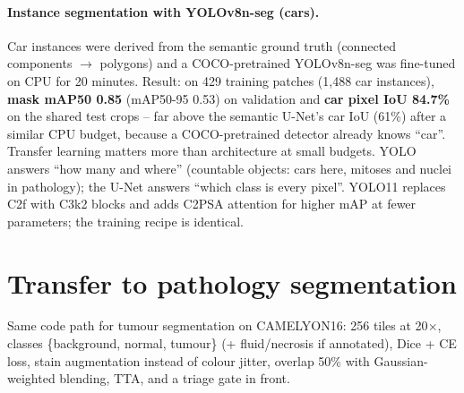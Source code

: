 \paragraph{Instance segmentation with YOLOv8n-seg (cars).} Car instances were derived from the semantic ground truth
(connected components $\to$ polygons) and a COCO-pretrained YOLOv8n-seg was fine-tuned on CPU for 20 minutes.
Result: on 429 training patches (1{,}488 car instances), \textbf{mask mAP50 0.85} (mAP50-95 0.53) on validation and
\textbf{car pixel IoU 84.7\%} on the shared test crops -- far above the semantic U-Net's car IoU (61\%) after a similar CPU budget,
because a COCO-pretrained detector already knows ``car''. Transfer learning matters more than architecture at small budgets.
YOLO answers ``how many and where'' (countable objects: cars here, mitoses and nuclei in pathology); the U-Net answers ``which class is every
pixel''. YOLO11 replaces C2f with C3k2 blocks and adds C2PSA attention for higher mAP at fewer parameters; the training recipe is identical.

\section{Transfer to pathology segmentation}
Same code path for tumour segmentation on CAMELYON16: 256 tiles at 20$\times$, classes \{background, normal, tumour\}
(+ fluid/necrosis if annotated), Dice + CE loss, stain augmentation instead of colour jitter, overlap 50\% with
Gaussian-weighted blending, TTA, and a triage gate in front.
